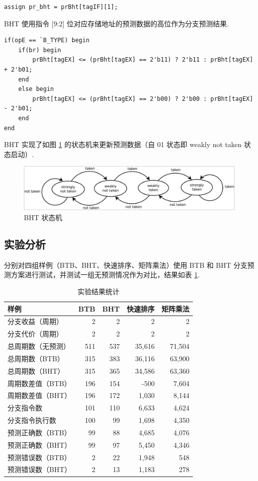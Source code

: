 \documentclass[UTF8]{ctexart}
\begin{document}
\begin{lstlisting}[style=verilog,caption={生成 BHT 预测结果}]
assign pr_bht = prBht[tagIF][1];
\end{lstlisting}

BHT 使用指令 [9:2] 位对应存储地址的预测数据的高位作为分支预测结果.

\begin{lstlisting}[style=verilog,caption={更新 BHT 保存数据}]
if(opE == `B_TYPE) begin
    if(br) begin
        prBht[tagEX] <= (prBht[tagEX] == 2'b11) ? 2'b11 : prBht[tagEX] + 2'b01;
    end
    else begin
        prBht[tagEX] <= (prBht[tagEX] == 2'b00) ? 2'b00 : prBht[tagEX] - 2'b01;
    end
end
\end{lstlisting}

BHT 实现了如图 \ref{bht} 的状态机来更新预测数据（自 01 状态即 weakly not taken 状态启动）.

\begin{figure}[htbp]
\centering
\includegraphics[width = .85\textwidth]{1.png}
\caption{BHT 状态机}
\label{bht}
\end{figure}

\subsection{实验分析}

分别对四组样例（BTB、BHT、快速排序、矩阵乘法）使用 BTB 和 BHT 分支预测方案进行测试，并测试一组无预测情况作为对比，结果如表 \ref{fx}.

\begin{table}[htbp]
\centering
\begin{tabular}{l|r r r r}
 \hline
样例 & BTB & BHT & 快速排序 & 矩阵乘法 \\
 \hline
分支收益（周期） & 2 & 2 & 2 & 2 \\
分支代价（周期） & 2 & 2 & 2 & 2 \\
总周期数（无预测） & 511 & 537 & 35,616 & 71,504 \\
总周期数（BTB） & 315 & 383 & 36,116 & 63,900 \\
总周期数（BHT） & 315 & 365 & 34,586 & 63,360 \\
周期数差值（BTB） & 196 & 154 & -500 & 7,604 \\
周期数差值（BHT） & 196 & 172 & 1,030 & 8,144 \\
分支指令数 & 101 & 110 & 6,633 & 4,624 \\
分支指令执行数 & 100 & 99 & 1,698 & 4,350 \\
预测正确数（BTB） & 99 & 88 & 4,685 & 4,076 \\
预测正确数（BHT） & 99 & 97 & 5,450 & 4,346 \\
预测错误数（BTB） & 2 & 22 & 1,948 & 548 \\
预测错误数（BHT） & 2 & 13 & 1,183 & 278 \\
 \hline
\end{tabular}
\caption{实验结果统计}
\label{fx}
\end{table}
\end{document}
